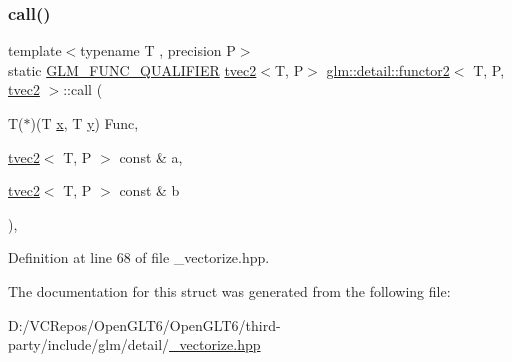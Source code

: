 \subsubsection{\texorpdfstring{call()}{call()}}
{\footnotesize\ttfamily template$<$typename T , precision P$>$ \\
static \mbox{\hyperlink{setup_8hpp_a33fdea6f91c5f834105f7415e2a64407}{G\+L\+M\+\_\+\+F\+U\+N\+C\+\_\+\+Q\+U\+A\+L\+I\+F\+I\+ER}} \mbox{\hyperlink{structglm_1_1tvec2}{tvec2}}$<$T, P$>$ \mbox{\hyperlink{structglm_1_1detail_1_1functor2}{glm\+::detail\+::functor2}}$<$ T, P, \mbox{\hyperlink{structglm_1_1tvec2}{tvec2}} $>$\+::call (\begin{DoxyParamCaption}\item[{T($\ast$)(T \mbox{\hyperlink{glad_8h_a92d0386e5c19fb81ea88c9f99644ab1d}{x}}, T \mbox{\hyperlink{glad_8h_a66ddd433d2cacfe27f5906b7e86faeed}{y}})}]{Func,  }\item[{\mbox{\hyperlink{structglm_1_1tvec2}{tvec2}}$<$ T, P $>$ const \&}]{a,  }\item[{\mbox{\hyperlink{structglm_1_1tvec2}{tvec2}}$<$ T, P $>$ const \&}]{b }\end{DoxyParamCaption})\hspace{0.3cm}{\ttfamily [inline]}, {\ttfamily [static]}}



Definition at line 68 of file \+\_\+vectorize.\+hpp.



The documentation for this struct was generated from the following file\+:\begin{DoxyCompactItemize}
\item 
D\+:/\+V\+C\+Repos/\+Open\+G\+L\+T6/\+Open\+G\+L\+T6/third-\/party/include/glm/detail/\mbox{\hyperlink{__vectorize_8hpp}{\+\_\+vectorize.\+hpp}}\end{DoxyCompactItemize}
